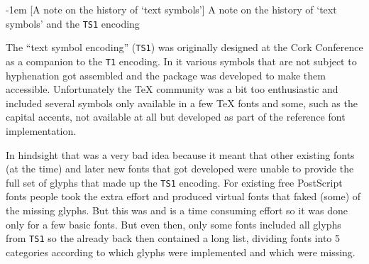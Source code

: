 \documentclass{ltnews}
\makeatletter
\renewcommand{\subsubsection}{%
   \@startsection      {subsubsection}{2}{0pt}{1.5ex \@plus 1ex \@minus .2ex}%
      {-1em}{\@subheadingfont\colonize}%
}
\newcommand\colonize[1]{#1:}
\makeatother
\begin{document}



 
\subsubsection[A note on the history of `text symbols']%
   {A note on the history of `text symbols' and
      the  \texttt{TS1} encoding}

The \enquote{text symbol encoding} (\texttt{TS1}) was originally
designed at the Cork Conference as a companion to the \texttt{T1}
encoding. In it various symbols that are not subject to hyphenation
got assembled and the  package was developed to make
them accessible. Unfortunately the \TeX{} community was a bit too
enthusiastic and included several symbols only available in a few
\TeX{} fonts and some, such as the capital accents, not available at
all but developed as part of the reference font implementation.

In hindsight that was a very bad idea because it meant that other
existing fonts (at the time) and later new fonts that got developed
were unable to provide the full set of glyphs that made up the
\texttt{TS1} encoding. For existing free PostScript fonts people 
took the extra effort and produced virtual fonts that faked (some) of
the missing glyphs. But this was and is a time consuming effort so it
was done only for a few basic fonts. But even then, only some fonts
included all glyphs from \texttt{TS1} so the  already
back then contained a long list, dividing fonts into 5 categories
according to which glyphs were implemented and which were missing.
\end{document}
